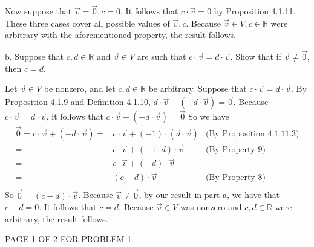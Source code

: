 \documentclass[12pt]{article}
\newenvironment{problem}[2][Problem]
{
	\begin{trivlist} 
		\item[\hskip \labelsep {\bfseries #1 #2:}]
	}
{
	\end{trivlist}
	}
\newenvironment{solution}[1][Solution]
{
	\begin{trivlist} 
		\item[\hskip \labelsep {\itshape #1:}]
	}
	{
	\end{trivlist}
}
\begin{document}
\begin{problem}{1}
\begin{solution}
\newline
\newline
\noindent
Now suppose that $\vec{v} =\vec{0}, c=0$. It follows that $c\cdot \vec{v} =0$ by Proposition 4.1.11.
\newline
\newline
\noindent
These three cases cover all possible values of $\vec{v}, c$. Because $\vec{v}\in V, c \in \mathbb{R}$ were arbitrary with the aforementioned property, the result follows.

\end{solution}
\noindent
\newline
\newline
b. Suppose that $c,d \in \mathbb{R}$ and $\vec{v}\in V$ are such that $c\cdot \vec{v}=d\cdot \vec{v}$. Show that if $\vec{v}\neq \vec{0}$, then $c=d$.
\begin{solution}
Let $\vec{v} \in V$ be nonzero, and let $c,d \in \mathbb{R}$ be arbitrary. Suppose that $c\cdot \vec{v}=d\cdot \vec{v}$. By Proposition 4.1.9 and Definition 4.1.10, $d \cdot \vec{v} + (-d\cdot \vec{v})=\vec{0}$. Because $c\cdot \vec{v}=d\cdot \vec{v}$, it follows that $c\cdot \vec{v} + (-d\cdot \vec{v})=\vec{0}$ So we have
\begin{align*}
\vec{0} = c\cdot \vec{v} + (-d\cdot \vec{v}) =& c\cdot \vec{v} + (-1)\cdot(d\cdot\vec{v}) & \text{(By Proposition 4.1.11.3)}\\
=& c\cdot \vec{v} + (-1\cdot d)\cdot \vec{v} & \text{(By Property 9)}\\
=& c\cdot \vec{v}+(-d) \cdot \vec{v} &\\
=&(c-d) \cdot \vec{v} & \text{(By Property 8)}\\
\end{align*}
So $\vec{0} = (c-d) \cdot \vec{v}$. Because $\vec{v} \neq \vec{0}$, by our result in part a, we have that $c-d=0$. It follows that $c=d$. Because $\vec{v} \in V$ was nonzero and $c,d\in \mathbb{R}$ were arbitrary, the result follows.
\vfill
\centerline{PAGE 1 OF 2 FOR PROBLEM 1}
\end{solution}
\end{problem}
\end{document}
